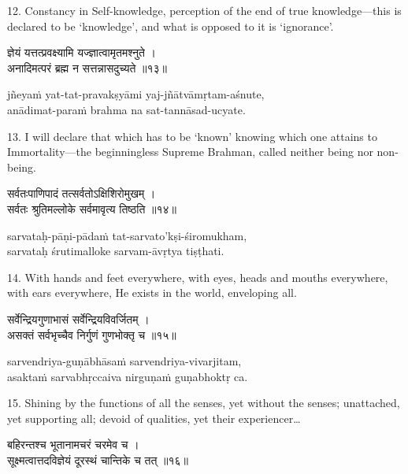 12. Constancy in Self-knowledge, perception of the end of true knowledge---this
is declared to be `knowledge', and what is opposed to it is `ignorance'.

\begin{gitaverse}
ज्ञेयं यत्तत्प्रवक्ष्यामि यज्ज्ञात्वामृतमश्नुते । \\
अनादिमत्परं ब्रह्म न सत्तन्नासदुच्यते ॥१३॥
\end{gitaverse}

\begin{transliteration}
jñeyaṁ yat-tat-pravakṣyāmi yaj-jñātvāmṛtam-aśnute, \\
anādimat-paraṁ brahma na sat-tannāsad-ucyate.
\end{transliteration}

13. I will declare that which has to be `known' knowing which one attains to
Immortality---the beginningless Supreme Brahman, called neither being nor
non-being.

\begin{gitaverse}
सर्वतःपाणिपादं तत्सर्वतोऽक्षिशिरोमुखम् । \\
सर्वतः श्रुतिमल्लोके सर्वमावृत्य तिष्ठति ॥१४॥
\end{gitaverse}

\begin{transliteration}
sarvataḥ-pāṇi-pādaṁ tat-sarvato'kṣi-śiromukham, \\
sarvataḥ śrutimalloke sarvam-āvṛtya tiṣṭhati.
\end{transliteration}

14. With hands and feet everywhere, with eyes, heads and mouths everywhere,
with ears everywhere, He exists in the world, enveloping all.

\begin{gitaverse}
सर्वेन्द्रियगुणाभासं सर्वेन्द्रियविवर्जितम् । \\
असक्तं सर्वभृच्चैव निर्गुणं गुणभोक्तृ च ॥१५॥
\end{gitaverse}

\begin{transliteration}
sarvendriya-guṇābhāsaṁ sarvendriya-vivarjitam, \\
asaktaṁ sarvabhṛccaiva nirguṇaṁ guṇabhoktṛ ca.
\end{transliteration}

15. Shining by the functions of all the senses, yet without the senses;
unattached, yet supporting all; devoid of qualities, yet their
experiencer\ldots

\begin{gitaverse}
बहिरन्तश्च भूतानामचरं चरमेव च । \\
सूक्ष्मत्वात्तदविज्ञेयं दूरस्थं चान्तिके च तत् ॥१६॥
\end{gitaverse}

